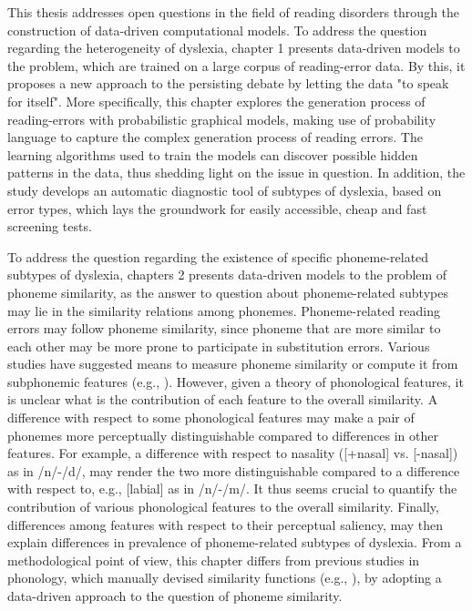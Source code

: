 This thesis addresses open questions in the field of reading disorders through the construction of data-driven computational models. To address the question regarding the heterogeneity of dyslexia, chapter 1 presents data-driven models to the problem, which are trained on a large corpus of reading-error data. By this, it proposes a new approach to the persisting debate by letting the data "to speak for itself". More specifically, this chapter explores the generation process of reading-errors with probabilistic graphical models, making use of probability language to capture the complex generation process of reading errors. The learning algorithms used to train the models can discover possible hidden patterns in the data, thus shedding light on the issue in question. In addition, the study develops an automatic diagnostic tool of subtypes of dyslexia, based on error types, which lays the groundwork for easily accessible, cheap and fast screening tests. 

To address the question regarding the existence of specific phoneme-related subtypes of dyslexia, chapters 2 presents data-driven models to the problem of phoneme similarity, as the answer to question about phoneme-related subtypes may lie in the similarity relations among phonemes. Phoneme-related reading errors may follow phoneme similarity, since phoneme that are more similar to each other may be more prone to participate in substitution errors. Various studies have suggested means to measure phoneme similarity \citep{NicelyMiller1955} or compute it from subphonemic features (e.g., \citealp{Pierrehumbert1993}). However, given a theory of phonological features, it is unclear what is the contribution of each feature to the overall similarity. A difference with respect to some phonological features may make a pair of phonemes more perceptually distinguishable compared to differences in other features. For example, a difference with respect to nasality ([+nasal] vs. [-nasal]) as in /n/-/d/, may render the two more distinguishable compared to a difference with respect to, e.g., [labial] as in /n/-/m/. It thus seems crucial to quantify the contribution of various phonological features to the overall similarity. Finally, differences among features with respect to their perceptual saliency, may then explain differences in prevalence of phoneme-related subtypes of dyslexia. From a methodological point of view, this chapter differs from previous studies in phonology, which manually devised similarity functions (e.g., \citealp{Frisch1997}), by adopting a data-driven approach to the question of phoneme similarity.

